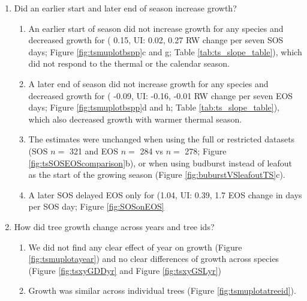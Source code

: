 \begin{enumerate}
\begin{enumerate}
  \end{enumerate}
  
\item Did an earlier start and later end of season increase growth? 

  \begin{enumerate}
  \item An earlier start of season did not increase growth for any species and decreased growth for {\Tame} (
  0.15, UI:
  0.02,
  0.27 RW change per seven SOS days; Figure \ref{fig:tsmuplotbspp}c and g; Table \ref{tab:ts_slope_table}), which did not respond to the thermal or the calendar season.

\item A later end of season did not increase growth for any species and decreased growth for {\Ball} (
-0.09, UI:
-0.16,
-0.01 RW change per seven EOS days; Figure \ref{fig:tsmuplotbspp}d and h; Table \ref{tab:ts_slope_table}), which also decreased growth with warmer thermal season.

\item The estimates were unchanged when using the full or restricted datasets (SOS $n =$
321 and EOS $n =$
284 vs $n=$
278; Figure \ref{fig:tsSOSEOScomparison}b), or when using budburst instead of leafout as the start of the growing season (Figure \ref{fig:buburstVSleafoutTS}c).


\item A later SOS delayed EOS only for {\Pdel} 
(1.04, UI:
0.39,
1.7 EOS change in days per SOS day; Figure \ref{fig:SOSonEOS}
\end{enumerate}

\item How did tree growth change across years and tree ids?
  \begin{enumerate}
  
  \item We did not find any clear effect of year on growth (Figure \ref{fig:tsmuplotayear}) and no clear differences of growth across species (Figure \ref{fig:tsxyGDDyr} and Figure \ref{fig:tsxyGSLyr})
  
  \item Growth was similar across individual trees (Figure \ref{fig:tsmuplotatreeid}).

  \end{enumerate}
\end{enumerate}

